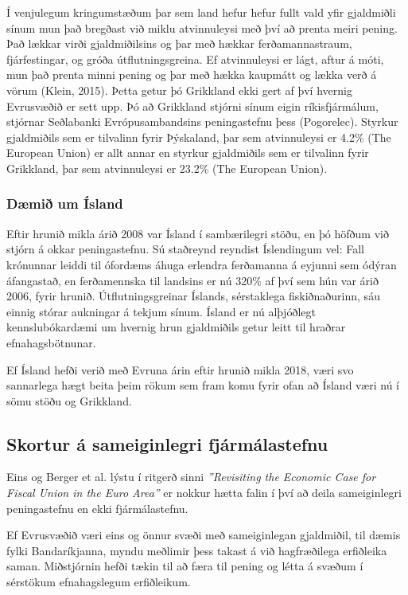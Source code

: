 \documentclass[a4paper]{article}
\begin{document}
Í venjulegum kringumstæðum þar sem land hefur hefur fullt vald yfir gjaldmiðli sínum mun það bregðast við miklu atvinnuleysi með því að prenta meiri pening. Það lækkar virði gjaldmiðilsins og þar með hækkar ferðamannastraum, fjárfestingar, og gróða útflutningsgreina. Ef atvinnuleysi er lágt, aftur á móti, mun það prenta minni pening og þar með hækka kaupmátt og lækka verð á vörum (Klein, 2015). Þetta getur þó Grikkland ekki gert af því hvernig Evrusvæðið er sett upp. Þó að Grikkland stjórni sínum eigin ríkisfjármálum, stjórnar Seðlabanki Evrópusambandsins  peningastefnu þess (Pogorelec). Styrkur gjaldmiðils sem er tilvalinn fyrir Þýskaland, þar sem atvinnuleysi er 4.2\% (The European Union) er allt annar en styrkur gjaldmiðils sem er tilvalinn fyrir Grikkland, þar sem atvinnuleysi er 23.2\% (The European Union).

\subsubsection{Dæmið um Ísland}

Eftir hrunið mikla árið 2008 var Ísland í sambærilegri stöðu, en þó höfðum við stjórn á okkar peningastefnu. Sú staðreynd reyndist Íslendingum vel: Fall krónunnar leiddi til ófordæms áhuga erlendra ferðamanna á eyjunni sem ódýran áfangastað,\cite{worldfinance_2015} en ferðamennska til landsins er nú 320\% af því sem hún var árið 2006, fyrir hrunið.\cite{hagstofan_passengers} Útflutningsgreinar Íslands, sérstaklega fiskiðnaðurinn, sáu einnig stórar aukningar á tekjum sínum. Ísland er nú alþjóðlegt kennslubókardæmi um hvernig hrun gjaldmiðils getur leitt til hraðrar efnahagsbötnunar.\cite{worldfinance_2015}

Ef Ísland hefði verið með Evruna árin eftir hrunið mikla 2018, væri svo sannarlega hægt beita þeim rökum sem fram komu fyrir ofan að Ísland væri nú í sömu stöðu og Grikkland.

\subsection{Skortur á sameiginlegri fjármálastefnu}

Eins og Berger et al. lýstu í ritgerð sinni \textit{''Revisiting the Economic Case for Fiscal Union in the Euro Area''} er nokkur hætta falin í því að deila sameiginlegri peningastefnu en ekki fjármálastefnu.

Ef Evrusvæðið væri eins og önnur svæði með sameiginlegan gjaldmiðil, til dæmis fylki Bandaríkjanna, myndu meðlimir þess takast á við hagfræðilega erfiðleika saman. Miðstjórnin hefði tækin til að færa til pening og létta á svæðum í sérstökum efnahagslegum erfiðleikum.\cite{fiscal_union}
\end{document}
